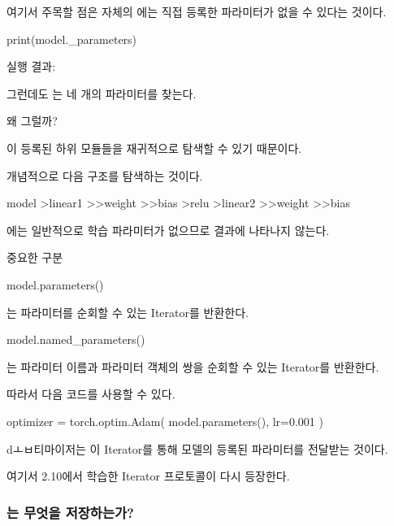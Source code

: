 여기서 주목할 점은  자체의 에는 직접 등록한 파라미터가 없을 수 있다는 것이다.

\begin{dhkcode}
print(model._parameters)
\end{dhkcode}

실행 결과:

\begin{dhkzsh}
{}
\end{dhkzsh}

그런데도 는 네 개의 파라미터를 찾는다.

왜 그럴까?

이 등록된 하위 모듈들을 재귀적으로 탐색할 수 있기 때문이다.

개념적으로 다음 구조를 탐색하는 것이다.

\begin{dhkdir}[in=6]
model
>linear1
>>weight
>>bias
>relu
>linear2
>>weight
>>bias
\end{dhkdir}

에는 일반적으로 학습 파라미터가 없으므로  결과에 나타나지 않는다.

\begin{dhknote}
\begin{dhksmry}[centered]
중요한 구분
\end{dhksmry}
\end{dhknote}

\begin{dhkcode}
model.parameters()
\end{dhkcode}

는 파라미터를 순회할 수 있는 Iterator를 반환한다.

\begin{dhkcode}
model.named_parameters()
\end{dhkcode}

는 파라미터 이름과 파라미터 객체의 쌍을 순회할 수 있는 Iterator를 반환한다.

따라서 다음 코드를 사용할 수 있다.

\begin{dhkcode}
optimizer = torch.optim.Adam(
    model.parameters(),
    lr=0.001
)
\end{dhkcode}

dㅗㅂ티마이저는 이 Iterator를 통해 모델의 등록된 파라미터를 전달받는 것이다.

여기서 2.10에서 학습한 Iterator 프로토콜이 다시 등장한다.

\subsubsection{는 무엇을 저장하는가?}

